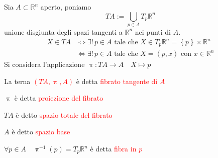         \begin{definizione}
        Sia $A \subset \mathbb{R}^n$ aperto, poniamo 
        \[ T A := \bigcup_{p \in A} T_p \mathbb{R}^n \]
        unione disgiunta degli spazi tangenti a $\mathbb{R}^n$ nei punti di $A$.
        \begin{align*}
        X \in T A &\iff \exists ! \, p \in A \text{ tale che } X \in T_p \mathbb{R}^n=\left\{p\right\} \times \mathbb{R}^n  \\
        &\iff \exists ! \, p \in A \text{ tale che } X=(p,x) \text{ con } x \in \mathbb{R}^n
        \end{align*}
        Si considera l'applicazione 
        $\uppi: T A \to A \quad X \mapsto p $
        
        La terna \textcolor{red}{$(T A, \uppi, A)$} è detta \textcolor{red}{fibrato tangente di $A$} 

        $\uppi$ è detta \textcolor{red}{proiezione del fibrato}

        $TA$ è detto \textcolor{red}{spazio totale del fibrato}

        $A$ è detto \textcolor{red}{spazio base}

        $\forall p \in A \quad \uppi^{-1}(p) = T_p \mathbb{R}^n$ è detta \textcolor{red}{fibra in $p$}
        \end{definizione}
